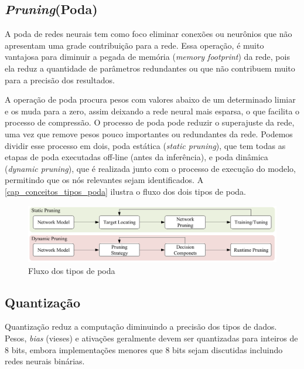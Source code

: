 \subsection{\textit{Pruning}(Poda)}\label{poda}

A poda de redes neurais tem como foco eliminar conexões ou neurônios que não apresentam uma grade contribuição para a
rede.
Essa operação, é muito vantajosa para diminuir a pegada de memória (\textit{memory footprint}) da rede, pois ela reduz
a quantidade de parâmetros redundantes ou que não contribuem muito para a precisão dos resultados.

A operação de poda procura pesos com valores abaixo de um determinado limiar e os muda para a zero, assim deixando
a rede neural mais esparsa, o que facilita o processo de compressão.
O processo de poda pode reduzir o superajuste da rede, uma vez que remove pesos pouco importantes ou redundantes
da rede.
Podemos dividir esse processo em dois, poda estática (\textit{static pruning}), que tem todas as etapas de poda
executadas off-line (antes da inferência), e poda dinâmica (\textit{dynamic pruning}), que é realizada junto com
o processo de execução do modelo, permitindo que os nós relevantes sejam identificados. A
\autoref{cap_conceitos_tipos_poda} ilustra o fluxo dos dois tipos de poda.

\begin{figure}[htb]
	\caption {\label{cap_conceitos_tipos_poda}Fluxo dos tipos de poda}
	\begin{center}
		\includegraphics[scale=0.5]{Imagens/categorias-poda}
	\end{center}
\end{figure}

\subsection{Quantização}\label{quantizacao}

Quantização reduz a computação diminuindo a precisão dos tipos de dados. Pesos, \textit{bias} (vieses) e ativações
geralmente devem ser quantizadas para inteiros de 8 bits, embora implementações menores que 8 bits sejam discutidas
incluindo redes neurais binárias. \cite{LIANG2021370}

